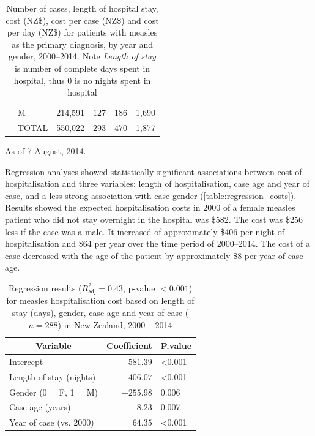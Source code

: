\documentclass{article}
\begin{document}
\begin{table}
\begin{center}
\begin{tabular}{lllrrl}
&     M&214,591&$127$&$186$&1,690\tabularnewline
&TOTAL&550,022&$293$&$470$&1,877\tabularnewline
\hline
\end{tabular}\end{center}\caption{Number of cases, length of hospital stay, cost (NZ\$), cost per case (NZ\$) and cost per day (NZ\$) for patients with measles as the primary diagnosis, by year and gender, 2000--2014. Note \textit{Length of stay} is number of complete days spent in hospital, thus 0 is no nights spent in hospital}
\label{table:cases}
 \centering
 \begin{tablenotes}
      \small
      \item As of 7 August, 2014.
    \end{tablenotes}
\end{table}

Regression analyses showed statistically significant associations between cost of hospitalisation and three variables: length of hospitalisation, case age and year of case, and a less strong association with case gender (\autoref{table:regression_costs}). Results showed the expected hospitalisation costs in 2000 of a female measles patient who did not stay overnight in the hospital was \$582.  The cost was \$256 less if the case was a male. It increased of approximately \$406 per night of hospitalisation and \$64 per year over the time period of 2000--2014. The cost of a case decreased with the age of the patient by approximately \$8 per year of case age.

\begin{table}
\begin{center}
\begin{tabular}{lrl}
\hline\hline
\multicolumn{1}{c}{Variable}&\multicolumn{1}{c}{Coefficient}&\multicolumn{1}{c}{P.value}\tabularnewline
\hline
Intercept&$ 581.39$&\textless  0.001\tabularnewline
Length of stay (nights)&$ 406.07$&\textless  0.001\tabularnewline
Gender (0 = F, 1 = M)&$-255.98$&0.006\tabularnewline
Case age (years)&$  -8.23$&0.007\tabularnewline
Year of case (vs. 2000)&$  64.35$&\textless  0.001\tabularnewline
\hline
\end{tabular}\end{center}\caption{Regression results ($R^{2}_\textsf{adj} = 0.43$, p-value $<0.001$) for measles hospitalisation cost based on length of stay (days), gender, case age and year of case ($n=288$) in New Zealand, 2000 -- 2014}
\label{table:regression_costs}
\end{table}
\end{document}
